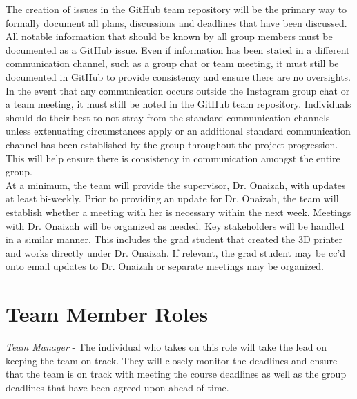 \documentclass{article}
\begin{document}
The creation of issues in the GitHub team repository will be the primary way to formally document all plans,
discussions and deadlines that have been discussed. All notable information that should be known by all group
members must be documented as a GitHub issue. Even if information has been stated in a different communication channel,
such as a group chat or team meeting, it must still be documented in GitHub to provide consistency and ensure there
are no oversights.\\

In the event that any communication occurs outside the Instagram group chat or a team meeting, it must still be
noted in the GitHub team repository. Individuals should do their best to not stray from the standard communication
channels unless extenuating circumstances apply or an additional standard communication channel has been established
by the group throughout the project progression. This will help ensure there is consistency in communication amongst
the entire group.\\

At a minimum, the team will provide the supervisor, Dr. Onaizah, with updates at least bi-weekly. Prior to providing
an update for Dr. Onaizah, the team will establish whether a meeting with her is necessary within the next week.
Meetings with Dr. Onaizah will be organized as needed. Key stakeholders will be handled in a similar manner. This
includes the grad student that created the 3D printer and works directly under Dr. Onaizah. If relevant, the grad
student may be cc’d onto email updates to Dr. Onaizah or separate meetings may be organized.

\section{Team Member Roles}

\iffalse
\wss{You should identify the types of roles you anticipate, like notetaker,
leader, meeting chair, reviewer.  Assigning specific people to those roles is
not necessary at this stage.  In a student team the role of the individuals will
likely change throughout the year.}
\fi

\textit{Team Manager} - The individual who takes on this role will take the lead on keeping the team on track. They
will closely monitor the deadlines and ensure that the team is on track with meeting the course deadlines as well as
the group deadlines that have been agreed upon ahead of time.\\
\end{document}
